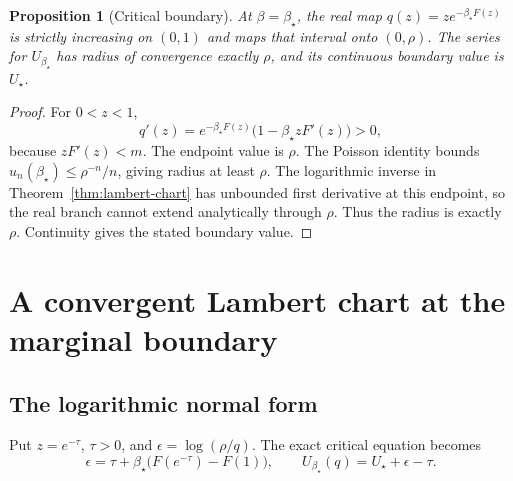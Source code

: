 \documentclass[11pt,a4paper]{article}
\numberwithin{equation}{section}
\newtheorem{proposition}[theorem]{Proposition}
\theoremstyle{definition}
\theoremstyle{remark}
\newcommand{\bs}{\beta_\star}
\newcommand{\Uc}{U_\star}
\begin{document}
\begin{proposition}[Critical boundary]
\label{prop:boundary}
At \(\beta=\bs\), the real map \(q(z)=z e^{-\bs F(z)}\) is strictly increasing
on \((0,1)\) and maps that interval onto \((0,\rho)\). The series for
\(U_{\bs}\) has radius of convergence exactly \(\rho\), and its continuous
boundary value is \(\Uc\).
\end{proposition}
\begin{proof}
For \(0<z<1\),
\[
 q'(z)=e^{-\bs F(z)}\bigl(1-\bs zF'(z)\bigr)>0,
\]
because \(zF'(z)<m\). The endpoint value is \(\rho\). The Poisson identity
bounds \(u_n(\bs)\le\rho^{-n}/n\), giving radius at least \(\rho\).
The logarithmic inverse in Theorem~\ref{thm:lambert-chart} has unbounded first
derivative at this endpoint, so the real branch cannot extend analytically
through \(\rho\). Thus the radius is exactly \(\rho\). Continuity gives the
stated boundary value.
\end{proof}

\section{A convergent Lambert chart at the marginal boundary}
\label{sec:chart}

\subsection{The logarithmic normal form}
Put \(z=e^{-\tau}\), \(\tau>0\), and
\(\epsilon=\log(\rho/q)\). The exact critical equation becomes
\begin{equation}
 \epsilon=\tau+\bs\bigl(F(e^{-\tau})-F(1)\bigr),\qquad
 U_{\bs}(q)=\Uc+\epsilon-\tau.
 \label{eq:epsilon}
\end{equation}
\end{document}
